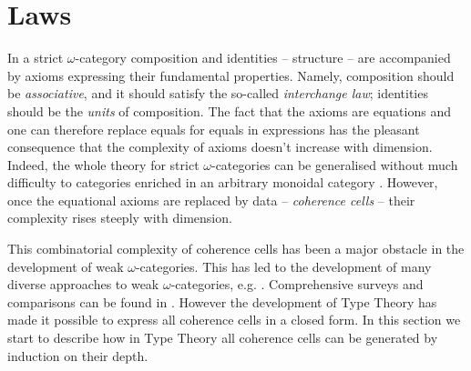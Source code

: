 \section{Laws}
\label{sec:laws}


%
In a strict $\omega$-category composition and
identities -- structure -- are accompanied by axioms expressing their fundamental
properties. Namely, composition should be \emph{associative}, and it
should satisfy the so-called \emph{interchange law}; identities should
be the \emph{units} of composition. The fact that the axioms are
equations and one can therefore replace equals for equals in
expressions has the pleasant consequence that the
complexity of axioms doesn't increase with dimension. Indeed, the whole theory
for strict $\omega$-categories can be generalised without much difficulty
to categories enriched in an arbitrary monoidal
category \cite{kelly:1982}. However, once 
the equational axioms are replaced by data -- \emph{coherence cells} -- their
complexity rises steeply with dimension. 

This combinatorial complexity of coherence cells has been a major
obstacle in the development of weak $\omega$-categories. This has led
to the development of many diverse approaches to weak
$\omega$-categories,
e.g. \cite{street87:simplexes,batanin98:monoidal-globular,baez:1998,
trimble:1999,penon:1999,leinster:2000,lumsdaine10:weak-o-categories}. Comprehensive
surveys and comparisons can be found in
\cite{leinster:survey,cheng:guidebook}. However the development of
Type Theory has made it possible to express all coherence cells in a
closed form. In this section we start to describe how in Type Theory
all coherence cells can be generated by induction on their depth.


